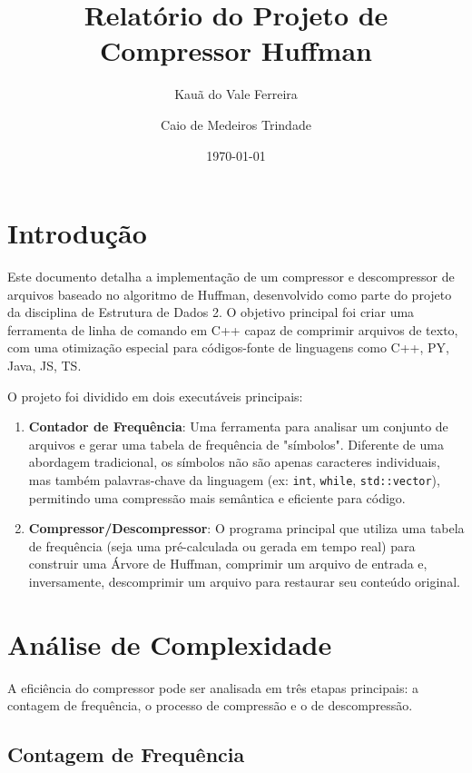 \documentclass[12pt, a4paper]{article}
\title{Relatório do Projeto de Compressor Huffman}
\author{Kauã do Vale Ferreira \and Caio de Medeiros Trindade}
\date{\today} %
\begin{document}
\maketitle %

\section{Introdução}

Este documento detalha a implementação de um compressor e descompressor de arquivos baseado no algoritmo de Huffman, desenvolvido como parte do projeto da disciplina de Estrutura de Dados 2. O objetivo principal foi criar uma ferramenta de linha de comando em C++ capaz de comprimir arquivos de texto, com uma otimização especial para códigos-fonte de linguagens como C++, PY, Java, JS, TS.

O projeto foi dividido em dois executáveis principais:
\begin{enumerate}
    \item \textbf{Contador de Frequência}: Uma ferramenta para analisar um conjunto de arquivos e gerar uma tabela de frequência de "símbolos". Diferente de uma abordagem tradicional, os símbolos não são apenas caracteres individuais, mas também palavras-chave da linguagem (ex: \texttt{int}, \texttt{while}, \texttt{std::vector}), permitindo uma compressão mais semântica e eficiente para código.
    \item \textbf{Compressor/Descompressor}: O programa principal que utiliza uma tabela de frequência (seja uma pré-calculada ou gerada em tempo real) para construir uma Árvore de Huffman, comprimir um arquivo de entrada e, inversamente, descomprimir um arquivo para restaurar seu conteúdo original.
\end{enumerate}

\section{Análise de Complexidade}

A eficiência do compressor pode ser analisada em três etapas principais: a contagem de frequência, o processo de compressão e o de descompressão.

\subsection{Contagem de Frequência}
\end{document}
